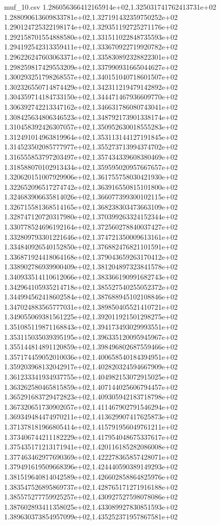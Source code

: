 \begin{filecontents*}{muf_10.csv}
1.286056366412165914e+02,1.325031741762413731e+02
1.288090613609833781e+02,1.327191432359750252e+02
1.290124725322198174e+02,1.329351192725271176e+02
1.292158701554888580e+02,1.331511022848735593e+02
1.294192542313359411e+02,1.333670922719920782e+02
1.296226247603063371e+02,1.335830892328822301e+02
1.298259817429553209e+02,1.337990931665044627e+02
1.300293251798268557e+02,1.340151040718601507e+02
1.302326550714874429e+02,1.342311219479142892e+02
1.304359714184733150e+02,1.344471467936609770e+02
1.306392742213347162e+02,1.346631786080743041e+02
1.308425634806346523e+02,1.348792173901338174e+02
1.310458392426307057e+02,1.350952630018555283e+02
1.312491014963819964e+02,1.353113144127191845e+02
1.314523502085777977e+02,1.355273713994374702e+02
1.316555853797203497e+02,1.357434339608380469e+02
1.318588070102913434e+02,1.359595020957667657e+02
1.320620151007929906e+02,1.361755758030421930e+02
1.322652096517274742e+02,1.363916550815101800e+02
1.324683906635814026e+02,1.366077399300102115e+02
1.326715581368514165e+02,1.368238303473663109e+02
1.328747120720317980e+02,1.370399263324152344e+02
1.330778524696192164e+02,1.372560278840037427e+02
1.332809793301221646e+02,1.374721350009613161e+02
1.334840926540152850e+02,1.376882476821101591e+02
1.336871924418064168e+02,1.379043659263170412e+02
1.338902786939900409e+02,1.381204897323841578e+02
1.340933514110612066e+02,1.383366190991682743e+02
1.342964105935214718e+02,1.385527540255052372e+02
1.344994562418602584e+02,1.387688945102108846e+02
1.347024883565777031e+02,1.389850405521410721e+02
1.349055069381561225e+02,1.392011921501298275e+02
1.351085119871168843e+02,1.394173493029993551e+02
1.353115035039395195e+02,1.396335120095945967e+02
1.355144814891120859e+02,1.398496802687559466e+02
1.357174459052010036e+02,1.400658540184394951e+02
1.359203968132042917e+02,1.402820324594667909e+02
1.361233341934937755e+02,1.404982153072915025e+02
1.363262580465815859e+02,1.407144025606794457e+02
1.365291683729472823e+02,1.409305942183718798e+02
1.367320651730902057e+02,1.411467902791546294e+02
1.369349484474970211e+02,1.413629907417625873e+02
1.371378181966805414e+02,1.415791956049761211e+02
1.373406744211182229e+02,1.417954048675337617e+02
1.375435171213171941e+02,1.420116185282086008e+02
1.377463462977690369e+02,1.422278365857428071e+02
1.379491619509668396e+02,1.424440590389149293e+02
1.381519640814042589e+02,1.426602858864825976e+02
1.383547526895869737e+02,1.428765171271916188e+02
1.385575277759925257e+02,1.430927527598078086e+02
1.387602893411358025e+02,1.433089927830851593e+02
1.389630373854957099e+02,1.435252371957867581e+02

\end{filecontents*}
